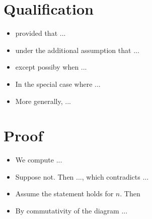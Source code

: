 \documentclass[11pt]{amsart}
\begin{document}
\newpage
\section*{Qualification}

\begin{itemize}
    \item provided that ... 
    \item under the additional assumption that ...
    \item except possiby when ...
    \item In the special case where ... 
    \item More generally, ...
\end{itemize}


\newpage
\section*{Proof}

\begin{itemize}
    \item We compute ... 
    \item Suppose not. Then ..., which contradicts ...
    \item Assume the statement holds for $n$. Then 
    \item By commutativity of the diagram ...
\end{itemize}

% 
% 
\end{document}
